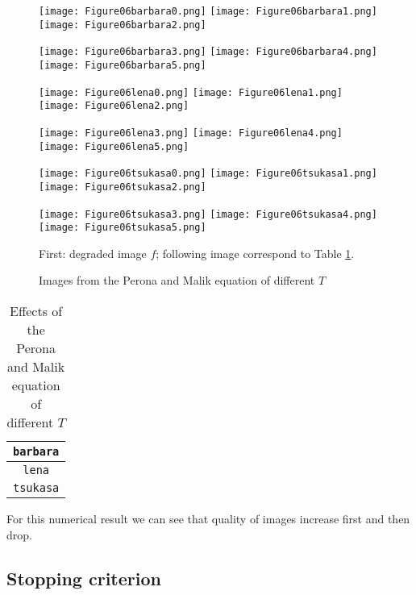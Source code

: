 \documentclass[english, nochinese]{pnote}
\begin{document}
\begin{figure}[htb]
{
\centering

\texttt{[image: Figure06barbara0.png]}
\texttt{[image: Figure06barbara1.png]}
\texttt{[image: Figure06barbara2.png]}

\texttt{[image: Figure06barbara3.png]}
\texttt{[image: Figure06barbara4.png]}
\texttt{[image: Figure06barbara5.png]}

\texttt{[image: Figure06lena0.png]}
\texttt{[image: Figure06lena1.png]}
\texttt{[image: Figure06lena2.png]}

\texttt{[image: Figure06lena3.png]}
\texttt{[image: Figure06lena4.png]}
\texttt{[image: Figure06lena5.png]}

\texttt{[image: Figure06tsukasa0.png]}
\texttt{[image: Figure06tsukasa1.png]}
\texttt{[image: Figure06tsukasa2.png]}

\texttt{[image: Figure06tsukasa3.png]}
\texttt{[image: Figure06tsukasa4.png]}
\texttt{[image: Figure06tsukasa5.png]}

\caption{Images from the Perona and Malik equation of different $T$}
\label{Fig:PMDyn}
}
{
\footnotesize First: degraded image $f$; following image correspond to Table \ref{Tbl:PMDyn}.
}
\end{figure}

\begin{table}[htb]
\centering
\begin{tabular}{|c|c|c|c|c|c|c|}
\hline
\multicolumn{7}{|c|}{\texttt{barbara}} \\
\hline

\multicolumn{7}{|c|}{\texttt{lena}} \\
\hline

\multicolumn{7}{|c|}{\texttt{tsukasa}} \\
\hline

\end{tabular}
\caption{Effects of the Perona and Malik equation of different $T$}
\label{Tbl:PMDyn}
\end{table}

For this numerical result we can see that quality of images increase first and then drop.

\subsection{Stopping criterion} \label{SubSec:Stop}
\end{document}
